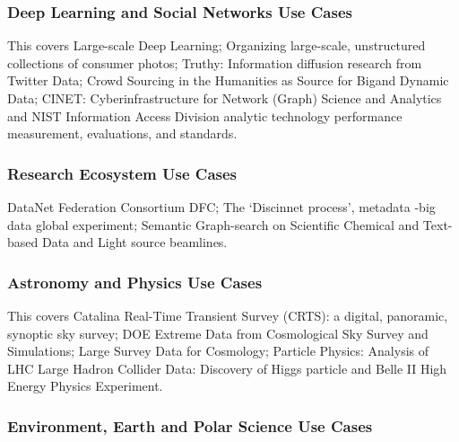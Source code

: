 \subsubsection{Deep Learning and Social Networks Use
Cases}\label{deep-learning-and-social-networks-use-cases}

This covers Large-scale Deep Learning; Organizing large-scale,
unstructured collections of consumer photos; Truthy: Information
diffusion research from Twitter Data; Crowd Sourcing in the Humanities
as Source for Bigand Dynamic Data; CINET: Cyberinfrastructure for
Network (Graph) Science and Analytics and NIST Information Access
Division analytic technology performance measurement, evaluations, and
standards.




\subsubsection{Research Ecosystem Use
Cases}\label{research-ecosystem-use-cases}

DataNet Federation Consortium DFC; The `Discinnet process', metadata
-big data global experiment; Semantic Graph-search on Scientific
Chemical and Text-based Data and Light source beamlines.




\subsubsection{Astronomy and Physics Use
Cases}\label{astronomy-and-physics-use-cases}

This covers Catalina Real-Time Transient Survey (CRTS): a digital,
panoramic, synoptic sky survey; DOE Extreme Data from Cosmological Sky
Survey and Simulations; Large Survey Data for Cosmology; Particle
Physics: Analysis of LHC Large Hadron Collider Data: Discovery of Higgs
particle and Belle II High Energy Physics Experiment.





\subsubsection{Environment, Earth and Polar Science Use
Cases}\label{environment-earth-and-polar-science-use-cases}

